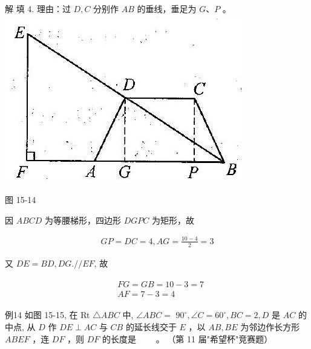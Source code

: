 \documentclass[10pt]{article}
\begin{document}
解 填 4. 理由：过 $D, C$ 分别作 $A B$ 的垂线，垂足为 $G 、 P$ 。\\
\includegraphics[max width=\textwidth, center]{2024_10_30_2c8f45efd4a519b08e1ag-143}

图 15-14

因 $A B C D$ 为等腰梯形，四边形 $D G P C$ 为矩形，故

\begin{align*}
G P=D C=4, A G=\frac{10-4}{2}=3
\end{align*}

又 $D E=B D, D G . / / E F$, 故

\begin{align*}
\begin{aligned}
& F G=G B=10-3=7 \\
& A F=7-3=4
\end{aligned}
\end{align*}

例14 如图 15-15, 在 Rt $\triangle A B C$ 中, $\angle A B C=$ $90^{\circ}, \angle C=60^{\circ}, B C=2, D$ 是 $A C$ 的中点, 从 $D$ 作 $D E \perp A C$ 与 $C B$ 的延长线交于 $E$ ，以 $A B, B E$ 为邻边作长方形 $A B E F$ ，连 $D F$ ，则 $D F$ 的长度是 $\qquad$。 （第 11 届"希望杯"竞赛题）
\end{document}
